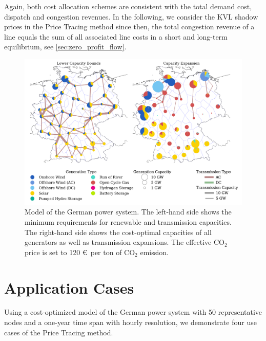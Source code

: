 \documentclass[11pt,twocolumn]{article}
\begin{document}
Again, both cost allocation schemes are consistent with the total demand cost, dispatch and congestion revenues. In the following, we consider the \ac{KVL} shadow prices in the Price Tracing method since then, the total congestion revenue of a line equals the sum of all associated line costs in a short and long-term equilibrium, see \cref{sec:zero_profit_flow}.  

\begin{figure}[h!]
    \centering
    \includegraphics[width=\linewidth]{de50/network}
    \caption{Model of the German power system. The left-hand side shows the minimum requirements for renewable and transmission capacities. The right-hand side shows the cost-optimal capacities of all generators as well as transmission expansions. The effective CO$_2$ price is set to 120 \euro\, per ton of CO$_2$ emission.}
    \label{fig:network}
\end{figure}
 

\section{Application Cases}
\label{sec:application_case}

Using a cost-optimized model of the German power system with 50 representative nodes and a one-year time span with hourly resolution, we demonstrate four use cases of the Price Tracing method. 
\end{document}
